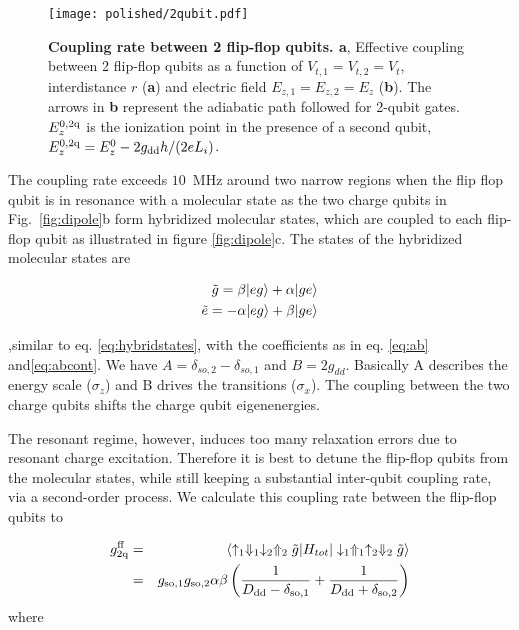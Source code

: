 \begin{figure}[h]
	\centering
	\texttt{[image: polished/2qubit.pdf]}
	\caption[Coupling rate between 2 flip-flop qubits]{\textbf{Coupling rate between 2 flip-flop qubits. a}, Effective coupling between 2 flip-flop qubits as a function of $V_{t,1}=V_{t,2}=V_t$, interdistance $r$ (\textbf{a}) and electric field $E_{z,1}=E_{z,2}=E_z$ (\textbf{b}). The arrows in \textbf{b} represent the adiabatic path followed for 2-qubit gates. $E_z^{\rm 0,2q}$ is the ionization point in the presence of a second qubit, $E_z^{\rm 0,2q}=E_z^0-2g_{\rm dd}h/(2eL_i)$.}
	\label{fig:2-qubit}
\end{figure}

The coupling rate exceeds $10$~MHz around two narrow regions when the flip flop qubit is in resonance with a molecular state as the two charge qubits in Fig.~\ref{fig:dipole}b form hybridized molecular states, which are coupled to each flip-flop qubit as illustrated in figure \ref{fig:dipole}c. The states of the hybridized molecular states are
 
\begin{eqnarray}
\tilde{g}=\beta|eg\rangle+\alpha|ge\rangle\\
\tilde{e}=-\alpha|eg\rangle+\beta|ge\rangle
\end{eqnarray}

,similar to eq. \eqref{eq:hybridstates}, with the coefficients as in eq. \eqref{eq:ab} and\eqref{eq:abcont}. We have $A=\delta_{so,2}-\delta_{so,1}$ and $B=2g_{dd}$. Basically A describes the energy scale ($\sigma_z$) and B drives the transitions ($\sigma_x$). 
The coupling between the two charge qubits shifts the charge qubit eigenenergies.

The resonant regime, however, induces too many relaxation errors due to resonant charge excitation. Therefore it is best to detune the flip-flop qubits from the molecular states, while still keeping a substantial inter-qubit coupling rate, via a second-order process.
 We calculate this coupling rate between the flip-flop qubits to 
 
 \begin{eqnarray}\label{eq:flipdipSWAP_Delta}
g_{\rm 2q}^{\rm ff} &=& \langle \uparrow_1\Downarrow_1 \downarrow_2\Uparrow_2 \tilde{g}|H_{tot}|\downarrow_1\Uparrow_1 \uparrow_2\Downarrow_2 \tilde{g}\rangle \\
& =& g_{\rm so,1}g_{\rm so,2}\alpha\beta\left(\frac{1}{D_{\rm dd}-\delta_{\rm so,1}}+\frac{1}{D_{\rm dd}+\delta_{\rm so,2}}\right)
\end{eqnarray}
where 

